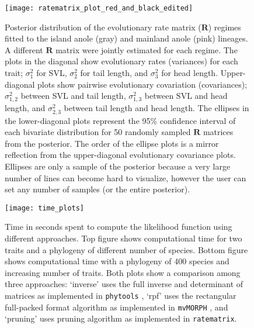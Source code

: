 \begin{figure}[h]
	\centering
	\texttt{[image: ratematrix\_plot\_red\_and\_black\_edited]}
	\caption[Posterior distribution of the evolutionary rate matrix ($\mathbf{R}$) regimes fitted to the island anole and mainland anole lineages.]{Posterior distribution of the evolutionary rate matrix ($\mathbf{R}$) regimes fitted to the island anole (gray) and mainland anole (pink) lineages. A different $\mathbf{R}$ matrix were jointly estimated for each regime. The plots in the diagonal show evolutionary rates (variances) for each trait; $\sigma_{1}^{2}$ for SVL, $\sigma_{2}^{2}$ for tail length, and $\sigma_{3}^{2}$ for head length. Upper-diagonal plots show pairwise evolutionary covariation (covariances); $\sigma_{1,2}^{2}$ between SVL and tail length, $\sigma_{1,3}^{2}$ between SVL and head length, and $\sigma_{2,3}^{2}$ between tail length and head length. The ellipses in the lower-diagonal plots represent the 95\% confidence interval of each bivariate distribution for 50 randomly sampled $\mathbf{R}$ matrices from the posterior. The order of the ellipse plots is a mirror reflection from the upper-diagonal evolutionary covariance plots. Ellipses are only a sample of the posterior because a very large number of lines can become hard to visualize, however the user can set any number of samples (or the entire posterior).}
	\label{fig:anolesGrid}
\end{figure}

\begin{figure}[h]
	\centering
	\texttt{[image: time\_plots]}
	\caption[Time in seconds spent to compute the likelihood function using different approaches.]{Time in seconds spent to compute the likelihood function using different approaches. Top figure shows computational time for two traits and a phylogeny of different number of species. Bottom figure shows computational time with a phylogeny of 400 species and increasing number of traits. Both plots show a comparison among three approaches: `inverse' uses the full inverse and determinant of matrices as implemented in \texttt{phytools} \citep{revell_phytools:_2012}, `rpf' uses the rectangular full-packed format algorithm as implemented in \texttt{mvMORPH} \citep{Clavel_mvmorph}, and `pruning' uses \citet{felsenstein_1973} pruning algorithm as implemented in \texttt{ratematrix}.}
	\label{fig:time_plot}
\end{figure}

